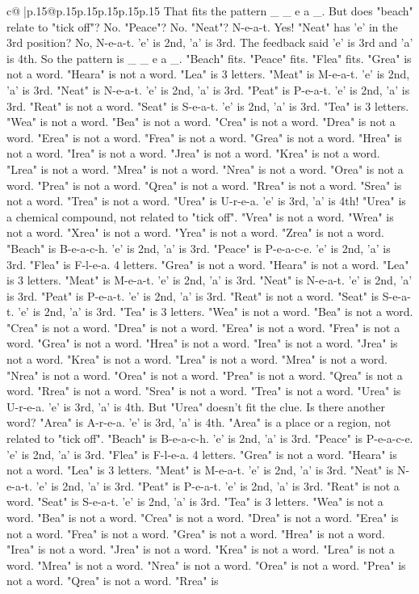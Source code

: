 \documentclass{article}
\begin{document}
{\begin{supertabular}{c@{$\;$}|p{.15\linewidth}@{}p{.15\linewidth}p{.15\linewidth}p{.15\linewidth}p{.15\linewidth}p{.15\linewidth}}
{{{That fits the pattern \_ \_ e a \_. But does "beach" relate to "tick off"? No. "Peace"? No. "Neat"? N{-}e{-}a{-}t. Yes! "Neat" has 'e' in the 3rd position? No, N{-}e{-}a{-}t. 'e' is 2nd, 'a' is 3rd. The feedback said 'e' is 3rd and 'a' is 4th. So the pattern is \_ \_ e a \_. "Beach" fits. "Peace" fits. "Flea" fits. "Grea" is not a word. "Heara" is not a word. "Lea" is 3 letters. "Meat" is M{-}e{-}a{-}t. 'e' is 2nd, 'a' is 3rd. "Neat" is N{-}e{-}a{-}t. 'e' is 2nd, 'a' is 3rd. "Peat" is P{-}e{-}a{-}t. 'e' is 2nd, 'a' is 3rd. "Reat" is not a word. "Seat" is S{-}e{-}a{-}t. 'e' is 2nd, 'a' is 3rd. "Tea" is 3 letters. "Wea" is not a word. "Bea" is not a word. "Crea" is not a word. "Drea" is not a word. "Erea" is not a word. "Frea" is not a word. "Grea" is not a word. "Hrea" is not a word. "Irea" is not a word. "Jrea" is not a word. "Krea" is not a word. "Lrea" is not a word. "Mrea" is not a word. "Nrea" is not a word. "Orea" is not a word. "Prea" is not a word. "Qrea" is not a word. "Rrea" is not a word. "Srea" is not a word. "Trea" is not a word. "Urea" is U{-}r{-}e{-}a. 'e' is 3rd, 'a' is 4th! "Urea" is a chemical compound, not related to "tick off". "Vrea" is not a word. "Wrea" is not a word. "Xrea" is not a word. "Yrea" is not a word. "Zrea" is not a word. "Beach" is B{-}e{-}a{-}c{-}h. 'e' is 2nd, 'a' is 3rd. "Peace" is P{-}e{-}a{-}c{-}e. 'e' is 2nd, 'a' is 3rd. "Flea" is F{-}l{-}e{-}a. 4 letters. "Grea" is not a word. "Heara" is not a word. "Lea" is 3 letters. "Meat" is M{-}e{-}a{-}t. 'e' is 2nd, 'a' is 3rd. "Neat" is N{-}e{-}a{-}t. 'e' is 2nd, 'a' is 3rd. "Peat" is P{-}e{-}a{-}t. 'e' is 2nd, 'a' is 3rd. "Reat" is not a word. "Seat" is S{-}e{-}a{-}t. 'e' is 2nd, 'a' is 3rd. "Tea" is 3 letters. "Wea" is not a word. "Bea" is not a word. "Crea" is not a word. "Drea" is not a word. "Erea" is not a word. "Frea" is not a word. "Grea" is not a word. "Hrea" is not a word. "Irea" is not a word. "Jrea" is not a word. "Krea" is not a word. "Lrea" is not a word. "Mrea" is not a word. "Nrea" is not a word. "Orea" is not a word. "Prea" is not a word. "Qrea" is not a word. "Rrea" is not a word. "Srea" is not a word. "Trea" is not a word. "Urea" is U{-}r{-}e{-}a. 'e' is 3rd, 'a' is 4th. But "Urea" doesn't fit the clue. Is there another word? "Area" is A{-}r{-}e{-}a. 'e' is 3rd, 'a' is 4th. "Area" is a place or a region, not related to "tick off". "Beach" is B{-}e{-}a{-}c{-}h. 'e' is 2nd, 'a' is 3rd. "Peace" is P{-}e{-}a{-}c{-}e. 'e' is 2nd, 'a' is 3rd. "Flea" is F{-}l{-}e{-}a. 4 letters. "Grea" is not a word. "Heara" is not a word. "Lea" is 3 letters. "Meat" is M{-}e{-}a{-}t. 'e' is 2nd, 'a' is 3rd. "Neat" is N{-}e{-}a{-}t. 'e' is 2nd, 'a' is 3rd. "Peat" is P{-}e{-}a{-}t. 'e' is 2nd, 'a' is 3rd. "Reat" is not a word. "Seat" is S{-}e{-}a{-}t. 'e' is 2nd, 'a' is 3rd. "Tea" is 3 letters. "Wea" is not a word. "Bea" is not a word. "Crea" is not a word. "Drea" is not a word. "Erea" is not a word. "Frea" is not a word. "Grea" is not a word. "Hrea" is not a word. "Irea" is not a word. "Jrea" is not a word. "Krea" is not a word. "Lrea" is not a word. "Mrea" is not a word. "Nrea" is not a word. "Orea" is not a word. "Prea" is not a word. "Qrea" is not a word. "Rrea" is }}}
\end{supertabular}}
\end{document}

